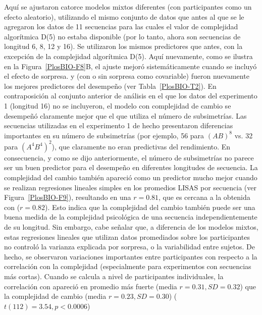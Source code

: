 Aquí se ajustaron catorce modelos mixtos diferentes (con participantes como un efecto aleatorio), utilizando el mismo conjunto de datos que antes al que se le agregaron los datos de 11 secuencias para las cuales el valor de complejidad algorítmica D(5) no estaba disponible (por lo tanto, ahora son secuencias de longitud 6, 8, 12 y 16). Se utilizaron los mismos predictores que antes, con la excepción de la complejidad algorítmica D(5). Aquí nuevamente, como se ilustra en la Figura~\ref{PlosBIO-F8}B, el ajuste mejoró sistemáticamente cuando se incluyó el efecto de sorpresa. \mdlbinfrag y \mdlbin (con o sin sorpresa como covariable) fueron nuevamente los mejores predictores del desempeño (ver Tabla~\ref{PlosBIO-T2}). En contraposición al conjunto anterior de análisis en el que los datos del experimento 1 (longitud 16) no se incluyeron, el modelo con complejidad de cambio se desempeñó claramente mejor que el que utiliza el número de subsimetrías. Las secuencias utilizadas en el experimento 1 de hecho presentaron diferencias importantes en su número de subsimetrías (por ejemplo, 56 para $(AB)^8$ vs. 32 para $(A^4B^4)^2$), que claramente no eran predictivas del rendimiento. En consecuencia, y como se dijo anteriormente, el número de subsimetrías no parece ser un buen predictor para el desempeño en diferentes longitudes de secuencia. La complejidad del cambio también apareció como un predictor mucho mejor cuando se realizan regresiones lineales simples en los promedios LISAS por secuencia (ver Figura~\ref{PlosBIO-F9}), resultando en una $r = 0.81$, que es cercana a la obtenida con \mdlbin ($r = 0.82$). Esto indica que la complejidad del cambio también puede ser una buena medida de la complejidad psicológica de una secuencia independientemente de su longitud. Sin embargo, cabe señalar que, a diferencia de los modelos mixtos, estas regresiones lineales que utilizan datos promediados sobre los participantes no controló la varianza explicada por sorpresa, o la variabilidad entre sujetos. De hecho, se observaron variaciones importantes entre participantes con respecto a la correlación con la complejidad (especialmente para experimentos con secuencias más cortas). Cuando se calcula a nivel de participantes individuales, la correlación con \mdlbin apareció en promedio más fuerte (media $r = 0.31, SD = 0.32$) que la complejidad de cambio (media $r = 0.23, SD = 0.30$) ($t (112) = 3.54, p < 0.0006$)

